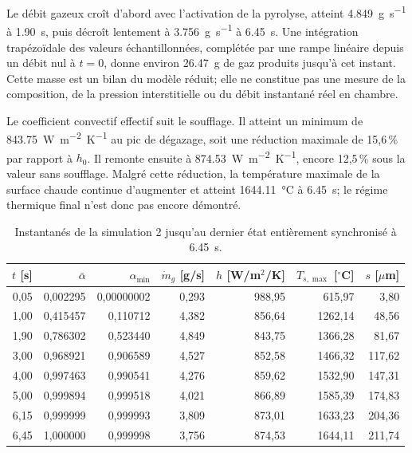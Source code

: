 \documentclass[oneside,openany]{amsdtx}
\begin{document}
Le débit gazeux croît d'abord avec l'activation de la pyrolyse, atteint
\SI{4.849}{g.s^{-1}} à \SI{1.90}{s}, puis décroît lentement à
\SI{3.756}{g.s^{-1}} à \SI{6.45}{s}. Une intégration trapézoïdale des valeurs
échantillonnées, complétée par une rampe linéaire depuis un débit nul à
\(t=0\), donne environ \SI{26.47}{g} de gaz produits jusqu'à cet instant.
Cette masse est un bilan du modèle réduit; elle ne constitue pas une mesure de
la composition, de la pression interstitielle ou du débit instantané réel en
chambre.

Le coefficient convectif effectif suit le soufflage. Il atteint un minimum de
\SI{843.75}{W.m^{-2}.K^{-1}} au pic de dégazage, soit une réduction maximale de
15,6\,\% par rapport à \(h_0\). Il remonte ensuite à
\SI{874.53}{W.m^{-2}.K^{-1}}, encore 12,5\,\% sous la valeur sans soufflage.
Malgré cette réduction, la température maximale de la surface chaude continue
d'augmenter et atteint \SI{1644.11}{\celsius} à \SI{6.45}{s}; le régime
thermique final n'est donc pas encore démontré.

\begin{table}[H]
\centering
\scriptsize
\renewcommand{\arraystretch}{1.16}
\begin{tabular}{rrrrrrr}
\toprule
\(t\) [s] & \(\bar\alpha\) & \(\alpha_\mathrm{min}\) &
\(\dot m_g\) [g/s] & \(h\) [W/m$^2$/K] &
\(T_{s,\max}\) [$^\circ$C] & \(s\) [$\mu$m] \\
\midrule
0,05 & 0,002295 & 0,00000002 & 0,293 & 988,95 & 615,97 & 3,80 \\
1,00 & 0,415457 & 0,110712 & 4,382 & 856,64 & 1262,14 & 48,56 \\
1,90 & 0,786302 & 0,523440 & 4,849 & 843,75 & 1366,28 & 81,67 \\
3,00 & 0,968921 & 0,906589 & 4,527 & 852,58 & 1466,32 & 117,62 \\
4,00 & 0,997463 & 0,990541 & 4,276 & 859,62 & 1532,90 & 147,31 \\
5,00 & 0,999894 & 0,999518 & 4,021 & 866,89 & 1585,39 & 174,83 \\
6,15 & 0,999999 & 0,999993 & 3,809 & 873,01 & 1633,23 & 204,36 \\
6,45 & 1,000000 & 0,999998 & 3,756 & 874,53 & 1644,11 & 211,74 \\
\bottomrule
\end{tabular}
\caption{Instantanés de la simulation 2 jusqu'au dernier état entièrement
synchronisé à \SI{6.45}{s}.}
\label{tab:sim2-results-snapshot}
\end{table}
\end{document}
